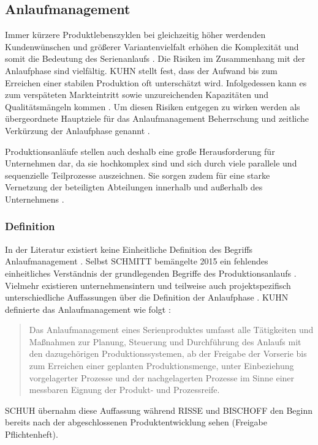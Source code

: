 
\subsection{Anlaufmanagement}
Immer kürzere Produktlebenszyklen bei gleichzeitig höher werdenden Kundenwünschen und größerer Variantenvielfalt erhöhen die Komplexität und somit die Bedeutung des Serienanlaufs \cite{Kuhn2002,Schuh2004}. Die Risiken im Zusammenhang mit der Anlaufphase sind vielfältig. KUHN %
stellt fest, dass der Aufwand bis zum Erreichen einer stabilen Produktion oft unterschätzt wird. Infolgedessen kann es zum verspäteten Markteintritt sowie unzureichenden Kapazitäten und Qualitätsmängeln kommen \cite{Kuhn2002}. Um diesen Risiken entgegen zu wirken werden als übergeordnete Hauptziele für das Anlaufmanagement Beherrschung und zeitliche Verkürzung der Anlaufphase genannt \cite{Kuhn2002, Schmitt2015}. 

Produktionsanläufe stellen auch deshalb eine große Herausforderung für Unternehmen dar, da sie hochkomplex sind und sich durch viele parallele und sequenzielle Teilprozesse auszeichnen. Sie sorgen zudem für eine starke Vernetzung der beteiligten Abteilungen innerhalb und außerhalb des Unternehmens \cite{Schuh2004}.


\subsubsection*{Definition}
In der Literatur existiert keine Einheitliche Definition des Begriffs Anlaufmanagement \cite[4]{Bischoff2007}. Selbst SCHMITT %
bemängelte 2015 ein fehlendes einheitliches Verständnis der grundlegenden Begriffe des Produktionsanlaufs \cite[1]{Schmitt2015}. Vielmehr existieren unternehmensintern und teilweise auch projektspezifisch unterschiedliche Auffassungen über die Definition der Anlaufphase \cite[11]{Grosshenning2005}. KUHN %
definierte das Anlaufmanagement wie folgt \cite[8]{Kuhn2002}: 
\begin{quotation}
Das Anlaufmanagement eines Serienproduktes umfasst alle Tätigkeiten und Maßnahmen zur Planung, Steuerung und Durchführung des Anlaufs mit den dazugehörigen Produktionssystemen, ab der Freigabe der Vorserie bis zum Erreichen einer geplanten Produktionsmenge, unter Einbeziehung vorgelagerter Prozesse und der nachgelagerten Prozesse im Sinne einer messbaren Eignung der Produkt- und Prozessreife.
\end{quotation}
SCHUH übernahm diese Auffassung \cite{Schuh08a} während RISSE und BISCHOFF den Beginn bereits nach der abgeschlossenen Produktentwicklung sehen \cite{Risse2002, Bischoff2007} (Freigabe Pflichtenheft).


